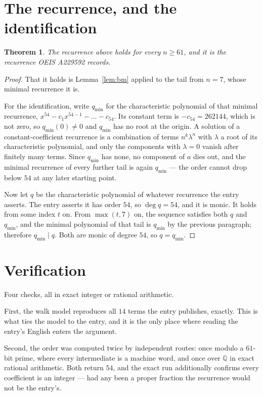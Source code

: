 \documentclass[11pt,a4paper]{article}
\theoremstyle{plain}
\newtheorem{theorem}{Theorem}
\theoremstyle{definition}
\begin{document}
\section{The recurrence, and the identification}

\begin{theorem}
The recurrence above holds for every $n\ge61$, and it is the recurrence OEIS A229592 records.
\end{theorem}

\begin{proof}
That it holds is Lemma~\ref{lem:bm} applied to the tail from $n=7$, whose minimal
recurrence it is.

For the identification, write $q_{\min}$ for the characteristic polynomial of that minimal
recurrence, $x^{54}-c_1x^{54-1}-\dots-c_{54}$. Its constant term is
$-c_{54}=262144$, which is not zero, so $q_{\min}(0)\neq0$ and $q_{\min}$ has no
root at the origin. A solution of a constant-coefficient recurrence is a combination of terms
$n^{k}\lambda^{n}$ with $\lambda$ a root of its characteristic polynomial, and only the
components with $\lambda=0$ vanish after finitely many terms. Since $q_{\min}$ has none, no
component of $a$ dies out, and the minimal recurrence of every further tail is again
$q_{\min}$ --- the order cannot drop below $54$ at any later starting point.

Now let $q$ be the characteristic polynomial of whatever recurrence the entry asserts. The
entry asserts it has order $54$, so $\deg q=54$, and it is monic. It holds from some
index $t$ on. From $\max(t,7)$ on, the sequence satisfies both $q$ and $q_{\min}$, and
the minimal polynomial of that tail is $q_{\min}$ by the previous paragraph; therefore
$q_{\min}\mid q$. Both are monic of degree $54$, so $q=q_{\min}$.
\end{proof}

\section{Verification}

Four checks, all in exact integer or rational arithmetic.

First, the walk model reproduces all $14$ terms the entry publishes, exactly. This is
what ties the model to the entry, and it is the only place where reading the entry's English
enters the argument.

Second, the order was computed twice by independent routes: once modulo a $61$-bit prime, where
every intermediate is a machine word, and once over $\mathbb{Q}$ in exact rational arithmetic.
Both return $54$, and the exact run additionally confirms every coefficient is an integer
--- had any been a proper fraction the recurrence would not be the entry's.
\end{document}

